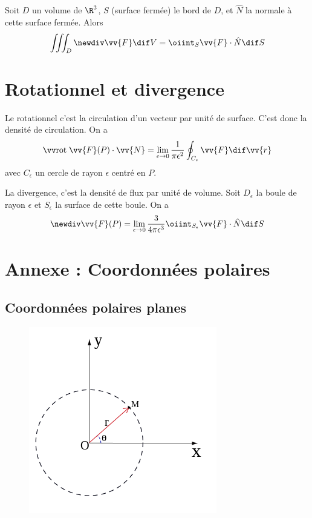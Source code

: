 \begin{mytheo}
	Soit $D$ un volume de $\R^3$, $S$ (surface fermée) le bord de $D$, et $\hat{N}$ la normale à cette surface fermée. Alors
	\[ \iiint_D \newdiv \vv{F} \dif V = \oiint_S \vv{F} \cdot \hat{N} \dif S \]
\end{mytheo}

\section{Rotationnel et divergence}

\begin{myprop}[Rotationnel]
	Le rotationnel c'est la circulation d'un vecteur par unité de surface. C'est donc la densité de circulation. On a
	\[ \rot \vv{F}(P) \cdot \vv{N} = \lim_{\epsilon \to 0} \frac 1{\pi \epsilon^2} \oint_{C_\epsilon} \vv{F} \dif \vv{r} \]
	avec $C_\epsilon$ un cercle de rayon $\epsilon$ centré en $P$.
\end{myprop}

\begin{myprop}[Divergence]
	La divergence, c'est la densité de flux par unité de volume. Soit $D_{\epsilon}$ la boule de rayon $\epsilon$ et $S_{\epsilon}$ la surface de cette boule. On a
	\[ \newdiv \vv{F}(P) = \lim_{\epsilon \to 0} \frac{3}{4 \pi \epsilon^3} \oiint_{S_{\epsilon}} \vv{F} \cdot \hat{N} \dif S \]
\end{myprop}


\biblio


\annexe
\section{Annexe : Coordonnées polaires\cite{adams2013calculus}}

\subsection{Coordonnées polaires planes}

\begin{figure}[ht!]
  \centering
  \includegraphics[scale = 0.5]{plan.png}
\end{figure}

